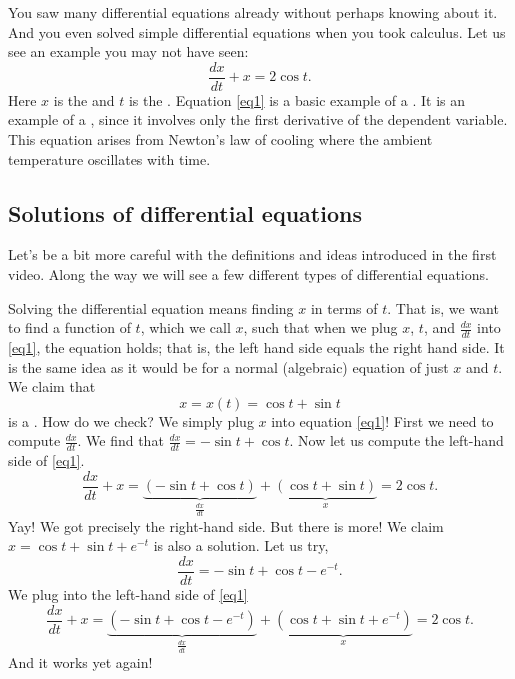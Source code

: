 You saw many
differential equations already without perhaps knowing about it.
And you even solved simple
differential equations when you took calculus.
Let us see an example you may not have seen:
\begin{equation} \label{eq1}
\frac{dx}{dt} + x = 2 \cos t .
\end{equation}
Here $x$ is the \emph{} and $t$ is the
\emph{}.
Equation \eqref{eq1}
is a basic example of a \emph{}.  It
is an example of a \emph{}, since
it involves only the first derivative of the dependent variable.  This 
equation arises from Newton's law of cooling where the ambient
temperature oscillates with time.

\subsection{Solutions of differential equations}

\begin{video}Let's be a bit more careful with the definitions and ideas introduced in the first video. Along the way we will see a few different types of differential equations. 
\end{video}

Solving the differential equation means finding $x$ in terms of $t$.  That
is, we want to find a function of $t$, which we call $x$, such that when
we plug $x$, $t$, and $\frac{dx}{dt}$ into \eqref{eq1}, the equation holds;
that is, the left hand side equals the right hand side.
It is
the same idea as it would be for a normal (algebraic) equation of just
$x$ and $t$.  We claim that
\begin{equation*}
x = x(t) = \cos t + \sin t
\end{equation*}
is a \emph{}.
How do we check?  We simply plug $x$ into equation \eqref{eq1}!  First we
need to compute $\frac{dx}{dt}$.  We find that $\frac{dx}{dt} = 
-\sin t + \cos t$.  Now let us compute the left-hand side
of \eqref{eq1}.
\begin{equation*}
\frac{dx}{dt} + x = 
\underbrace{(-\sin t + \cos t)}_{\frac{dx}{dt}}
+
\underbrace{(\cos t + \sin t)}_{x}
=
2\cos t .
\end{equation*}
Yay!  We got precisely the right-hand side.
But there is more!
We claim
$x = \cos t + \sin t + e^{-t}$ is also
a solution.  Let us try,
\begin{equation*}
\frac{dx}{dt} = -\sin t + \cos t - e^{-t} .
\end{equation*}
We plug into the left-hand side of \eqref{eq1}
\begin{equation*}
\frac{dx}{dt} + x = 
\underbrace{(-\sin t + \cos t - e^{-t})}_{\frac{dx}{dt}} +
\underbrace{(\cos t + \sin t + e^{-t})}_{x}
= 2\cos t .
\end{equation*}
And it works yet again!

